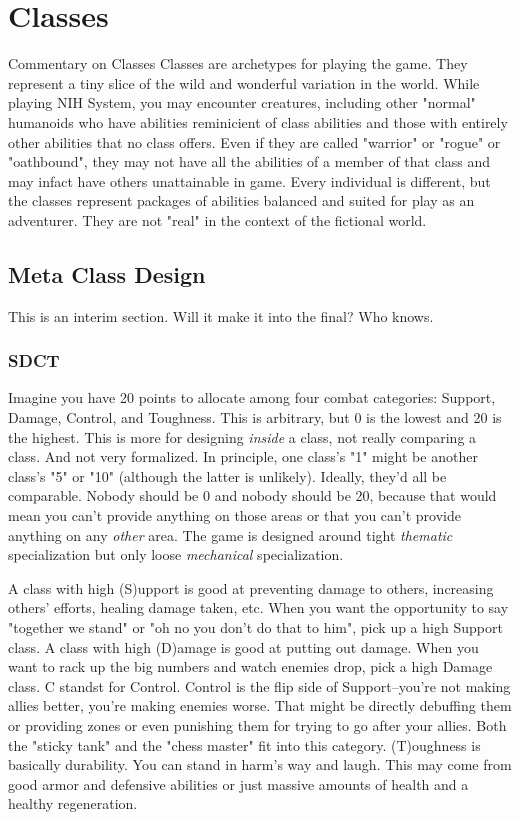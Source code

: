 \chapter{Classes}
\label{ch:classes}

\begin{DndComment}{Commentary on Classes}
Classes are archetypes for playing the game. They represent a tiny slice of the wild and wonderful variation in the world. While playing NIH System, you may encounter creatures, including other "normal" humanoids who have abilities reminicient of class abilities and those with entirely other abilities that no class offers. Even if they are called "warrior" or "rogue" or "oathbound", they may not have all the abilities of a member of that class and may infact have others unattainable in game. Every individual is different, but the classes represent packages of abilities balanced and suited for play as an adventurer. They are not "real" in the context of the fictional world.
\end{DndComment}

\section{Meta Class Design}
This is an interim section. Will it make it into the final? Who knows.

\subsection{SDCT}
Imagine you have 20 points to allocate among four combat categories: Support, Damage, Control, and Toughness. This is arbitrary, but 0 is the lowest and 20 is the highest. This is more for designing \textit{inside} a class, not really comparing a class. And not very formalized. In principle, one class's "1" might be another class's "5" or "10" (although the latter is unlikely). Ideally, they'd all be comparable. Nobody should be 0 and nobody should be 20, because that would mean you can't provide anything on those areas or that you can't provide anything on any \textit{other} area. The game is designed around tight \textit{thematic} specialization but only loose \textit{mechanical} specialization. 

A class with high (S)upport is good at preventing damage to others, increasing others' efforts, healing damage taken, etc. When you want the opportunity to say "together we stand" or "oh no you don't do that to him", pick up a high Support class. A class with high (D)amage is good at putting out damage. When you want to rack up the big numbers and watch enemies drop, pick a high Damage class. C standst for Control. Control is the flip side of Support--you're not making allies better, you're making enemies worse. That might be directly debuffing them or providing zones or even punishing them for trying to go after your allies. Both the "sticky tank" and the "chess master" fit into this category. (T)oughness is basically durability. You can stand in harm's way and laugh. This may come from good armor and defensive abilities or just massive amounts of health and a healthy regeneration.

